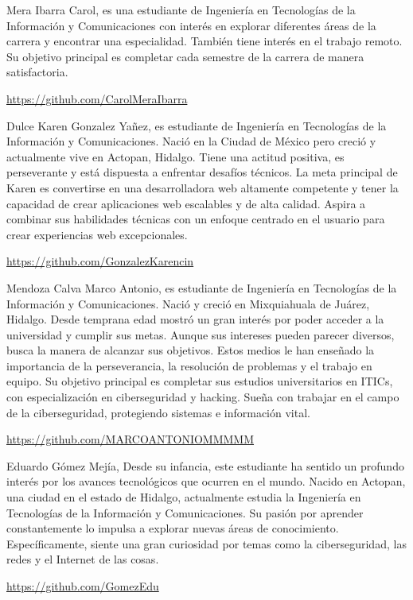 \documentclass{IEEEcsmag}
\begin{document}
\begin{IEEEbiography}{Mera Ibarra Carol}{,} es una estudiante de Ingeniería en Tecnologías de la Información y Comunicaciones con interés en explorar diferentes áreas de la carrera y encontrar una especialidad. También tiene interés en el trabajo remoto. Su objetivo principal es completar cada semestre de la carrera de manera satisfactoria.

\url{https://github.com/CarolMeraIbarra}
\end{IEEEbiography}

\begin{IEEEbiography}{Dulce Karen Gonzalez Yañez}{,} es estudiante de Ingeniería en Tecnologías de la Información y Comunicaciones. Nació en la Ciudad de México pero creció y actualmente vive en Actopan, Hidalgo. Tiene una actitud positiva, es perseverante y está dispuesta a enfrentar desafíos técnicos. La meta principal de Karen es convertirse en una desarrolladora web altamente competente y tener la capacidad de crear aplicaciones web escalables y de alta calidad. Aspira a combinar sus habilidades técnicas con un enfoque centrado en el usuario para crear experiencias web excepcionales.

\url{https://github.com/GonzalezKarencin}
\end{IEEEbiography}

\begin{IEEEbiography}{Mendoza Calva Marco Antonio}{,} es estudiante de Ingeniería en Tecnologías de la Información y Comunicaciones. Nació y creció en Mixquiahuala de Juárez, Hidalgo. Desde temprana edad mostró un gran interés por poder acceder a la universidad y cumplir sus metas. Aunque sus intereses pueden parecer diversos, busca la manera de alcanzar sus objetivos. Estos medios le han enseñado la importancia de la perseverancia, la resolución de problemas y el trabajo en equipo. Su objetivo principal es completar sus estudios universitarios en ITICs, con especialización en ciberseguridad y hacking. Sueña con trabajar en el campo de la ciberseguridad, protegiendo sistemas e información vital.

\url{https://github.com/MARCOANTONIOMMMMM}
\end{IEEEbiography}

\begin{IEEEbiography}{Eduardo Gómez Mejía}{,} Desde su infancia, este estudiante ha sentido un profundo interés por los avances tecnológicos que ocurren en el mundo. Nacido en Actopan, una ciudad en el estado de Hidalgo, actualmente estudia la Ingeniería en Tecnologías de la Información y Comunicaciones. Su pasión por aprender constantemente lo impulsa a explorar nuevas áreas de conocimiento. Específicamente, siente una gran curiosidad por temas como la ciberseguridad, las redes y el Internet de las cosas.

\url{https://github.com/GomezEdu}
\end{IEEEbiography}
\end{document}
